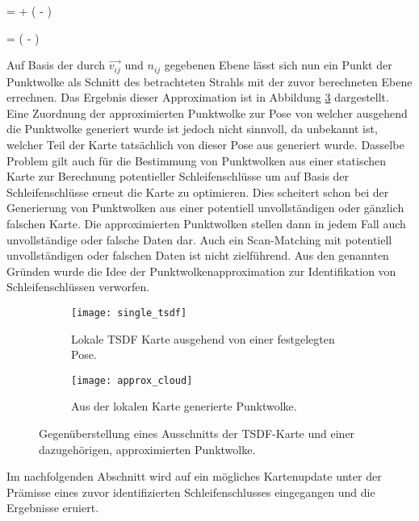 \begin{myequation}
 =  + \left( - \right) \cdot {}
\end{myequation}

\begin{myequation}
 = \left( - \right)
\end{myequation}

Auf Basis der durch $\vec{v_{ij}}$ und $n_{ij}$ gegebenen Ebene lässt sich nun ein Punkt der Punktwolke als Schnitt des betrachteten Strahls mit der zuvor berechneten Ebene errechnen. Das Ergebnis dieser Approximation ist in Abbildung \ref{fig:pointcloud_approximation} dargestellt. Eine Zuordnung der approximierten Punktwolke zur Pose von welcher ausgehend die Punktwolke generiert wurde ist jedoch nicht sinnvoll, da unbekannt ist, welcher Teil der Karte tatsächlich von dieser Pose aus generiert wurde. Dasselbe Problem gilt auch für die Bestimmung von Punktwolken aus einer statischen Karte zur Berechnung potentieller Schleifenschlüsse um auf Basis der Schleifenschlüsse erneut die Karte zu optimieren. Dies scheitert schon bei der Generierung von Punktwolken aus einer potentiell unvollständigen oder gänzlich falschen Karte. Die approximierten Punktwolken stellen dann in jedem Fall auch unvollständige oder falsche Daten dar. Auch ein Scan-Matching mit potentiell unvollständigen oder falschen Daten ist nicht zielführend. Aus den genannten Gründen wurde die Idee der Punktwolkenapproximation zur Identifikation von Schleifenschlüssen verworfen.

\begin{figure}
	\centering
	\begin{subfigure}{.5\textwidth}
 		 \centering
  		 \texttt{[image: single\_tsdf]}
  		 \centering \caption{Lokale TSDF Karte ausgehend von einer festgelegten Pose.}
  		 \label{fig:single_tsdf}
	\end{subfigure}%
	\begin{subfigure}{.5\textwidth}
    	\centering
  		\texttt{[image: approx\_cloud]}
  		\centering \caption{Aus der lokalen Karte generierte Punktwolke.}
  		\label{fig:approx_cloud}
	\end{subfigure}
	\caption{Gegenüberstellung eines Ausschnitts der TSDF-Karte und einer dazugehörigen, approximierten Punktwolke.}
	\label{fig:pointcloud_approximation}
\end{figure}

Im nachfolgenden Abschnitt wird auf ein mögliches Kartenupdate unter der Prämisse eines zuvor identifizierten Schleifenschlusses eingegangen und die Ergebnisse eruiert.

